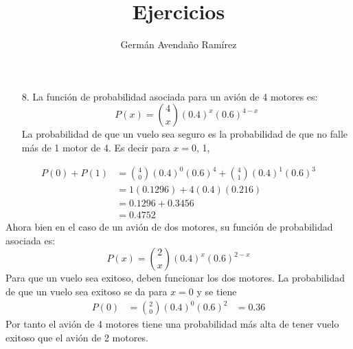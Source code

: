 \documentclass[10pt,letterpaper]{article}
\author{Germán Avendaño Ramírez}
\title{Ejercicios}
\begin{document}
\maketitle
\begin{itemize}
\item[8.] La función de probabilidad asociada para un avi\'{o}n de 4 motores es:
\[P(x)=\displaystyle{4 \choose x}(0.4)^{x}(0.6)^{4-x}\]
La probabilidad de que un vuelo sea seguro es la probabilidad de que no falle más de 1 motor de 4. Es decir para $x=0$, 1, 
\end{itemize}
\begin{align*}
P(0)+P(1)&=\displaystyle{4 \choose 0}(0.4)^{0}(0.6)^{4}+\displaystyle{4 \choose 1}(0.4)^{1}(0.6)^{3}\\
&=1(0.1296)+4(0.4)(0.216)\\
&=0.1296+0.3456\\
&=0.4752
\end{align*}
Ahora bien en el caso de un avión de dos motores, su función de probabilidad asociada es:
\[P(x)=\displaystyle{2\choose x}(0.4)^{x}(0.6)^{2-x}\]
Para que un vuelo sea exitoso, deben funcionar los dos motores. La probabilidad de que un vuelo sea exitoso se da para $x=0$ y se tiene
\begin{align*}
P(0)&=\displaystyle{2\choose 0}(0.4)^{0}(0.6)^{2}
&=0.36
\end{align*}
Por tanto el avión de 4 motores tiene una probabilidad más alta de tener vuelo exitoso que el avión de 2 motores.
\end{document}
